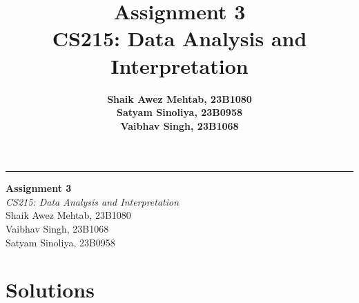 \documentclass[oneside]{report}
\title{
\vspace{3cm} 
\Huge \textbf{Assignment 3}\\
\vspace{0.5cm}
\Large CS215: Data Analysis and Interpretation
\vspace{0.5cm}
}
\author{
    \textbf{Shaik Awez Mehtab, 23B1080} \\
    \textbf{Satyam Sinoliya, 23B0958} \\
    \textbf{Vaibhav Singh, 23B1068}
}
\date{}
\begin{document}
\begin{titlepage}
	\raggedleft
	\rule{1pt}{\textheight}
	\hspace{0.05\textwidth}
	\parbox[b]{0.75\textwidth}{
	{\Huge\bfseries Assignment 3\\[2\baselineskip]}
		{\Large\textit{CS215: Data Analysis and Interpretation}}\\[4\baselineskip]
	{\Large{Shaik Awez Mehtab, 23B1080 \\ Vaibhav Singh, 23B1068 \\ Satyam Sinoliya, 23B0958}}\\
	\vspace{0.5\textheight}
	}
\end{titlepage}
\chapter{Solutions}


\setcounter{equation}{0}

\setcounter{equation}{0}

\setcounter{equation}{0}

\setcounter{equation}{0}

\end{document}
